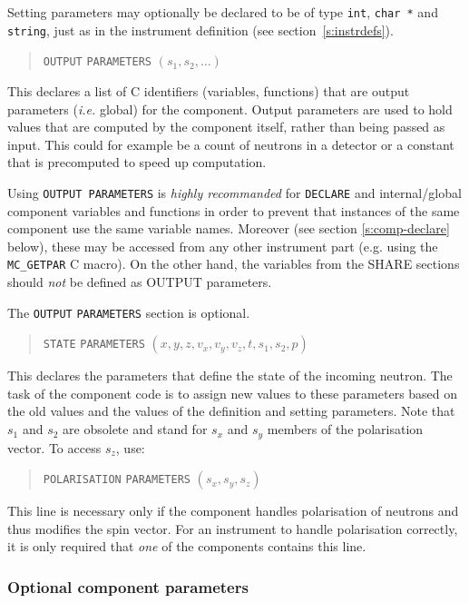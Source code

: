 Setting parameters may optionally be declared to be of type
\verb+int+, \verb+char *+ and \verb+string+, just as in the instrument definition (see section~\ref{s:instrdefs}).

\begin{quote}
  \texttt{OUTPUT} \texttt{PARAMETERS} $(s_1, s_2, \ldots)$
\end{quote}
This declares a list of C identifiers (variables, functions) that are
output parameters ({\it i.e.} global) for the
component. Output parameters are used to hold values that are computed
by the component itself, rather than being passed as input. This could
for example be a count of neutrons in a detector or a constant that is
precomputed to speed up computation.

Using \texttt{OUTPUT PARAMETERS} is \emph{highly recommanded} for
\texttt{DECLARE} and internal/global component variables and functions
in order to prevent that instances of the same component use the same variable names. Moreover (see section \ref{s:comp-declare} below), these may be accessed from any other instrument part (e.g. using the \verb+MC_GETPAR+ C macro).
On the other hand, the variables from the SHARE sections should \emph{not}
be defined as OUTPUT parameters.

The \texttt{OUTPUT} \texttt{PARAMETERS} section is optional.

\begin{quote}
  \texttt{STATE} \texttt{PARAMETERS} $(x,y,z,v_x,v_y,v_z,t,s_1,s_2,p)$
\end{quote}
This declares the parameters that define the state of the incoming
neutron. The task of the component code is to assign new values to these
parameters based on the old values and the values of the definition and
setting parameters. Note that $s_1$ and $s_2$ are obsolete and stand for
$s_x$ and $s_y$ members of the polarisation vector. To access $s_z$, use:
\begin{quote}
  \texttt{POLARISATION} \texttt{PARAMETERS} $(s_x,s_y,s_z)$
\end{quote}
This line is necessary only if the component handles polarisation of neutrons
and thus modifies the spin vector. For an instrument to handle polarisation
correctly, it is only required that {\em one} of the components contains this
line.

\subsubsection{Optional component parameters}

